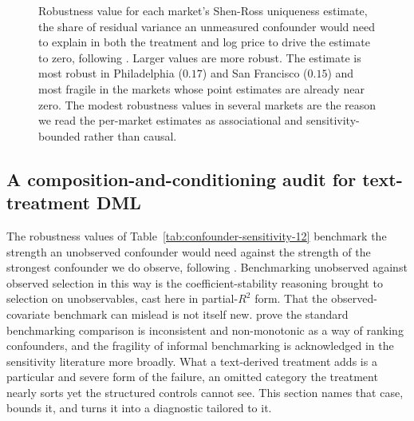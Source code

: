 \begin{figure}[H]
\centering
{}
\caption{Robustness value for each market's Shen-Ross uniqueness estimate, the share
of residual variance an unmeasured confounder would need to explain in both the
treatment and log price to drive the estimate to zero, following
\citet{cinelli2020making}. Larger values are more robust. The estimate is most
robust in Philadelphia ($0.17$) and San Francisco ($0.15$) and most fragile in
the markets whose point estimates are already near zero. The modest robustness
values in several markets are the reason we read the per-market estimates as
associational and sensitivity-bounded rather than causal.}
\label{fig:sensitivity-rv}
\end{figure}

\subsection{A composition-and-conditioning audit for text-treatment DML}
\label{sec:coca}

The robustness values of Table~\ref{tab:confounder-sensitivity-12} benchmark the
strength an unobserved confounder would need against the strength of the strongest
confounder we do observe, following \citet{cinelli2020making}. Benchmarking unobserved against observed selection in this way is the coefficient-stability reasoning \citet{oster2019unobservable} brought to selection on unobservables, cast here in partial-$R^2$ form. That the observed-covariate benchmark can mislead is not itself new. \citet{diegert2026axiomatic} prove the standard benchmarking comparison is inconsistent and non-monotonic as a way of ranking confounders, and the fragility of informal benchmarking is acknowledged in the sensitivity literature more broadly. What a text-derived treatment adds is a particular and severe form of the failure, an omitted category the treatment nearly sorts yet the structured controls cannot see. This section names that case, bounds it, and turns it into a diagnostic tailored to it.

